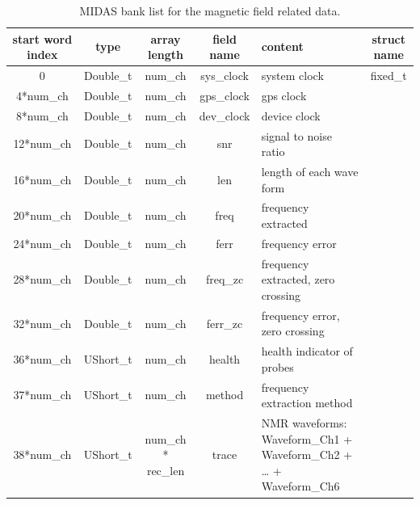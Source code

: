 \begin{table}[htbp]
\centering
\caption{MIDAS bank list for the magnetic field related data.}
\begin{tabular}{|c|c|c|c|p{4cm}|c|}
\hline
start word index & type      & array length       & field name & content                                                          & struct name \\
\hline
0                & Double\_t & num\_ch            & sys\_clock & system clock                                                     & fixed\_t                    \\
\hline
4*num\_ch        & Double\_t & num\_ch            & gps\_clock & gps clock                                                        &                             \\
\hline
8*num\_ch        & Double\_t & num\_ch            & dev\_clock & device clock                                                     &                             \\
\hline
12*num\_ch       & Double\_t & num\_ch            & snr        & signal to noise ratio                                            &                             \\
\hline
16*num\_ch       & Double\_t & num\_ch            & len        & length of each wave form                                         &                             \\
\hline
20*num\_ch       & Double\_t & num\_ch            & freq       & frequency extracted                                              &                             \\
\hline
24*num\_ch       & Double\_t & num\_ch            & ferr       & frequency error                                                  &                             \\
\hline
28*num\_ch       & Double\_t & num\_ch            & freq\_zc   & frequency extracted, zero crossing                               &                             \\
\hline
32*num\_ch       & Double\_t & num\_ch            & ferr\_zc   & frequency error, zero crossing                                   &                             \\
\hline
36*num\_ch       & UShort\_t & num\_ch            & health     & health indicator of probes                                       &                             \\
\hline
37*num\_ch       & UShort\_t & num\_ch            & method     & frequency extraction method                                      &                             \\
\hline
38*num\_ch       & UShort\_t & num\_ch * rec\_len & trace      & NMR waveforms: Waveform\_Ch1 + Waveform\_Ch2 + … + Waveform\_Ch6 &     \\    
\hline
\end{tabular} 
\label{tab:fxprtable}
\end{table}

